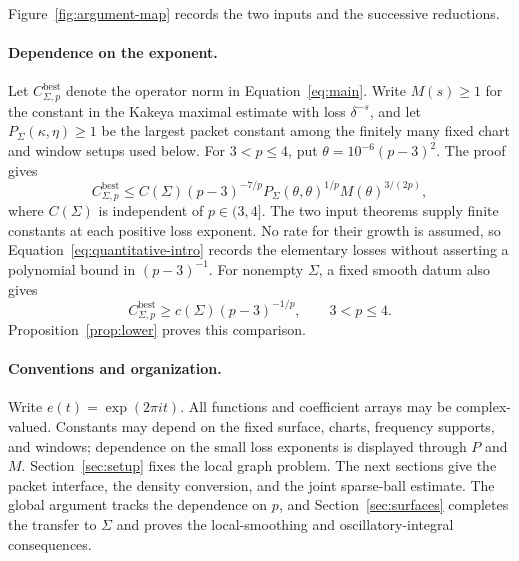Figure~\ref{fig:argument-map} records the two inputs and the successive
reductions.



\paragraph{Dependence on the exponent.}
Let \(C_{\Sigma,p}^{\mathrm{best}}\) denote the operator norm in
Equation~\eqref{eq:main}. Write \(M(s)\ge1\) for the constant in
the Kakeya maximal estimate with loss \(\delta^{-s}\), and let
\(P_\Sigma(\kappa,\eta)\ge1\) be the largest packet constant
among the finitely many fixed chart and window setups used below.
For \(3<p\le4\), put \(\theta=10^{-6}(p-3)^2\). The proof gives
\begin{equation}\label{eq:quantitative-intro}
 C_{\Sigma,p}^{\mathrm{best}}
 \le C(\Sigma)(p-3)^{-7/p}
 P_\Sigma(\theta,\theta)^{1/p}M(\theta)^{3/(2p)},
\end{equation}
where \(C(\Sigma)\) is independent of \(p\in(3,4]\).
The two input theorems supply finite constants at each positive
loss exponent. No rate for their growth is assumed, so
Equation~\eqref{eq:quantitative-intro} records the elementary
losses without asserting a polynomial bound in \((p-3)^{-1}\).
For nonempty \(\Sigma\), a fixed smooth datum also gives
\begin{equation}\label{eq:lower-intro}
 C_{\Sigma,p}^{\mathrm{best}}
 \ge c(\Sigma)(p-3)^{-1/p},\qquad 3<p\le4.
\end{equation}
Proposition~\ref{prop:lower} proves this comparison.

\paragraph{Conventions and organization.}
Write \(e(t)=\exp(2\pi i t)\). All functions and coefficient
arrays may be complex-valued. Constants may depend on the fixed
surface, charts, frequency supports, and windows; dependence on
the small loss exponents is displayed through \(P\) and \(M\).
Section~\ref{sec:setup} fixes the local graph problem. The next
sections give the packet interface, the density conversion, and
the joint sparse-ball estimate. The global argument tracks the
dependence on \(p\), and Section~\ref{sec:surfaces} completes
the transfer to \(\Sigma\) and proves the local-smoothing and
oscillatory-integral consequences.
